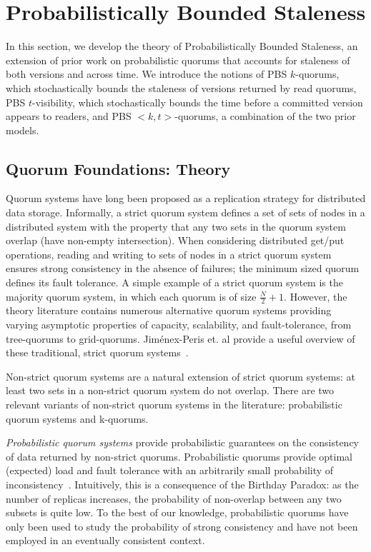 \documentclass{vldb}
\begin{document}
\section{Probabilistically Bounded Staleness}
\label{sec:theory}

In this section, we develop the theory of Probabilistically Bounded
Staleness, an extension of prior work on probabilistic quorums that
accounts for staleness of both versions and across time.  We introduce
the notions of PBS $k$-quorums, which stochastically bounds the
staleness of versions returned by read quorums, PBS $t$-visibility,
which stochastically bounds the time before a committed version
appears to readers, and PBS $<k, t>$-quorums, a combination of the two
prior models.

\subsection{Quorum Foundations: Theory}

Quorum systems have long been proposed as a replication strategy for
distributed data storage.  Informally, a strict quorum system defines
a set of sets of nodes in a distributed system with the property that
any two sets in the quorum system overlap (have non-empty
intersection).  When considering distributed get/put operations,
reading and writing to sets of nodes in a strict quorum system ensures
strong consistency in the absence of failures; the minimum sized
quorum defines its fault tolerance.  A simple example of a strict
quorum system is the majority quorum system, in which each quorum is
of size $\frac{N}{2}+1$.  However, the theory literature contains
numerous alternative quorum systems providing varying asymptotic
properties of capacity, scalability, and fault-tolerance, from
tree-quorums to grid-quorums.  Jim\'{e}nex-Peris et. al provide a
useful overview of these traditional, strict quorum
systems~\cite{quorums-alternative}.

Non-strict quorum systems are a natural extension of strict quorum
systems: at least two sets in a non-strict quorum system do not
overlap.  There are two relevant variants of non-strict quorum systems in
the literature: probabilistic quorum systems and k-quorums.

\textit{Probabilistic quorum systems} provide probabilistic guarantees
on the consistency of data returned by non-strict quorums.
Probabilistic quorums provide optimal (expected) load and fault
tolerance with an arbitrarily small probability of
inconsistency~\cite{prob-quorum}.  Intuitively, this is a consequence
of the Birthday Paradox: as the number of replicas increases, the
probability of non-overlap between any two subsets is quite low.  To
the best of our knowledge, probabilistic quorums have only been used
to study the probability of strong consistency and have not been
employed in an eventually consistent context.
\end{document}
